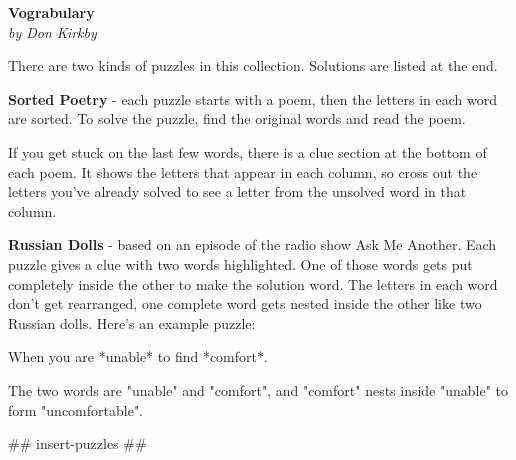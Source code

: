 \documentclass[letterpaper,10pt]{extarticle}
\begin{document}
\begin{center}
   \Large\textbf{Vograbulary}\\
   \large\textit{by Don Kirkby}
\end{center}
{\fontsize{10pt}{0.1em}\selectfont
There are two kinds of puzzles in this collection. Solutions are listed at the
end.

\textbf{Sorted Poetry} - each puzzle starts with a poem, then the letters in
each word are sorted. To solve the puzzle, find the original words and read the
poem.

If you get stuck on the last few words, there is a clue section at the bottom of
each poem. It shows the letters that appear in each column, so cross out the
letters you've already solved to see a letter from the unsolved word in that
column.

\textbf{Russian Dolls} - based on an episode of the radio show Ask Me Another.
Each puzzle gives a clue with two words highlighted. One of those words gets put
completely inside the other to make the solution word. The letters in each word
don't get rearranged, one complete word gets nested inside the other like two
Russian dolls. Here's an example puzzle:

When you are *unable* to find *comfort*.

The two words are "unable" and "comfort", and "comfort" nests inside "unable" to
form "uncomfortable".
}

## insert-puzzles ##
\end{document}
